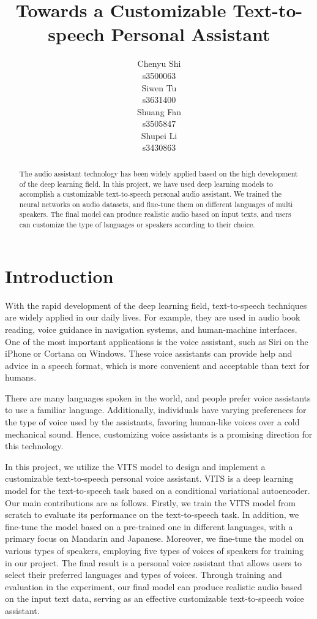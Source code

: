 \documentclass{article}
\title{Towards a Customizable Text-to-speech Personal Assistant}
\author{
 Chenyu Shi\\
   s3500063\\
   \And
 Siwen Tu\\
   s3631400\\
   \And
 Shuang Fan \\
   s3505847\\
   \And
 Shupei Li \\
   s3430863\\
}
\begin{document}
\maketitle
\begin{abstract}
The audio assistant technology has been widely applied based on the high development of the deep learning field. In this project, we have used deep learning models to accomplish a customizable text-to-speech personal audio assistant. We trained the neural networks on audio datasets, and fine-tune them on different languages of multi speakers. The final model can produce realistic audio based on input texts, and users can customize the type of languages or speakers according to their choice.
\end{abstract}




\section{Introduction}\label{sec:intro}
With the rapid development of the deep learning field, text-to-speech techniques are widely applied in our daily lives. For example, they are used in audio book reading, voice guidance in navigation systems, and human-machine interfaces. One of the most important applications is the voice assistant, such as Siri on the iPhone or Cortana on Windows. These voice assistants can provide help and advice in a speech format, which is more convenient and acceptable than text for humans.

There are many languages spoken in the world, and people prefer voice assistants to use a familiar language. Additionally, individuals have varying preferences for the type of voice used by the assistants, favoring human-like voices over a cold mechanical sound. Hence, customizing voice assistants is a promising direction for this technology.

In this project, we utilize the VITS model \cite{2021kim} to design and implement a customizable text-to-speech personal voice assistant. VITS is a deep learning model for the text-to-speech task based on a conditional variational autoencoder. Our main contributions are as follows. Firstly, we train the VITS model from scratch to evaluate its performance on the text-to-speech task. In addition, we fine-tune the model based on a pre-trained one in different languages, with a primary focus on Mandarin and Japanese. Moreover, we fine-tune the model on various types of speakers, employing five types of voices of speakers for training in our project. The final result is a personal voice assistant that allows users to select their preferred languages and types of voices. Through training and evaluation in the experiment, our final model can produce realistic audio based on the input text data, serving as an effective customizable text-to-speech voice assistant.
\end{document}
